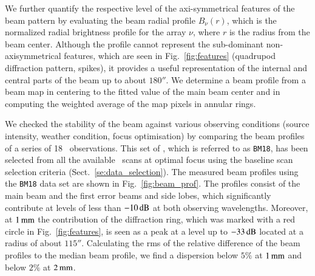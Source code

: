 We further quantify the respective level of the axi-symmetrical
features of the beam pattern by evaluating the beam radial profile
$B_\nu(r)$, which is the normalized radial brightness profile for the
array $\nu$, where $r$ is the radius from the beam center.
Although the profile cannot represent the sub-dominant non-axisymmetrical
features, which are seen in Fig.~\ref{fig:features} (quadrupod
diffraction pattern, spikes), it provides a useful
representation of the internal and central parts of the beam {\lp up to
 about $180''$.} We determine a beam profile from a beam map in centering to
the fitted value of the main beam center and in computing the
weighted average of the map pixels in annular rings.

We checked the stability of the beam against various
observing conditions (source intensity, weather condition, focus
optimisation) by comparing the beam profiles of a series of 18 \bm\
observations.
This set of \bms, which is referred to as {\tt BM18}, has been
selected from all the available \bm\ scans at optimal focus using the
baseline scan selection criteria (Sect.~\ref{se:data_selection}).
The measured beam profiles using the {\tt BM18} data set are shown in
Fig.~\ref{fig:beam_prof}. {\lp The profiles consist of the main beam and
the first error beams and side lobes, which significantly contribute
at levels of less than $-10\,\rm{dB}$ at both observing
wavelengths. Moreover, at $1\,\rm{mm}$ the contribution of the
diffraction ring, which was marked with a red circle in Fig.~\ref{fig:features},
is seen as a peak at a level up to $-33\,\rm{dB}$ located at a radius
of about $115''$.} Calculating the {\lp rms of the relative}
difference of the beam profiles to the median beam profile, we find a
dispersion below $5\%$ at $1\,\rm{mm}$ and below $2\%$ at
$2\,\rm{mm}$.

